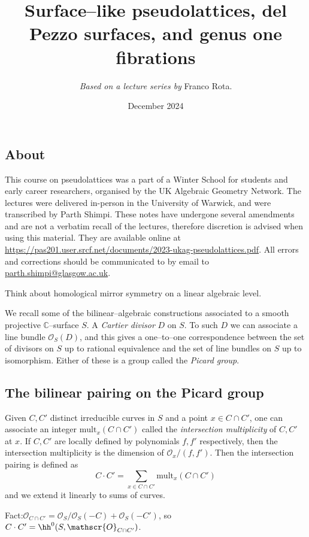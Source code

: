 \title{Surface--like pseudolattices, del Pezzo surfaces, and genus one
fibrations}
\author{\textit{Based on a lecture series by }Franco Rota.}
\date{December 2024}
\maketitle

\subsection{About} This course on pseudolattices was a part of a Winter
School for students and early career researchers, organised by the UK Algebraic
Geometry Network. The lectures were delivered in-person in the University of
Warwick, and were transcribed by Parth Shimpi. These notes have undergone
several amendments and are not a verbatim recall of the lectures, therefore
discretion is advised when using this material. They are available online at
\url{https://pas201.user.srcf.net/documents/2023-ukag-pseudolattices.pdf}.
All errors and corrections should be communicated to by email to
\url{parth.shimpi@glasgow.ac.uk}.

Think about homological mirror symmetry on a linear algebraic level.

We recall some of the bilinear--algebraic constructions associated to a smooth
projective \(\mathbb{C}\)--surface \(S\). A \emph{Cartier divisor} \(D\) on
\(S\). To such \(D\) we can associate a line bundle \(\mathscr{O}_S(D)\), and
this gives a one--to--one correspondence between the set of divisors on \(S\) up
to rational equivalence and the set of line bundles on \(S\) up to isomorphism.
Either of these is a group called the \emph{Picard group}.

\subsection{The bilinear pairing on the Picard group} Given \(C,C'\) distinct
irreducible curves in \(S\) and a point \(x\in C\cap C'\), one can associate an
integer \(\text{mult}_x(C\cap C')\) called the \emph{intersection multiplicity}
of \(C,C'\) at \(x\). If \(C,C'\) are locally defined by polynomials \(f,f'\)
respectively, then the intersection multiplicity is the dimension of
\(\mathscr{O}_x/(f,f')\). Then the intersection pairing is defined as
\[C\cdot C' = \sum_{x\in C\cap C'} \text{mult}_x(C\cap C')\]
and we extend it linearly to sums of curves.

Fact:\(\mathscr{O}_{C\cap C'}=\mathscr{O}_S/\mathscr{O}_S(-C) +
\mathscr{O}_S(-C')\), so \(C\cdot C'=\hh^0(S,\mathscr{O}_{C\cap C'})\).

